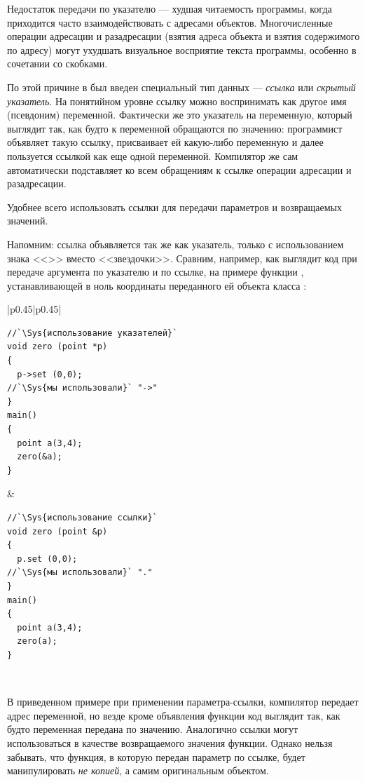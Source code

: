 Недостаток передачи по указателю --- худшая читаемость программы, когда приходится часто взаимодействовать с адресами
объектов. Многочисленные операции адресации и разадресации (взятия адреса объекта и взятия содержимого по адресу) могут
ухудшать визуальное восприятие текста программы, особенно в сочетании со скобками. 

По этой причине в  был введен специальный тип данных --- \emph{ссылка} или 
\emph{скрытый указатель}. На понятийном уровне ссылку можно воспринимать как другое имя
(псевдоним) переменной. Фактически же это указатель на переменную, который выглядит так, как будто к переменной
обращаются по значению: программист объявляет такую ссылку, присваивает ей какую-либо переменную и далее пользуется
ссылкой как еще одной переменной. Компилятор же сам автоматически подставляет ко всем обращениям к ссылке операции
адресации и разадресации.

Удобнее всего использовать ссылки для передачи параметров и возвращаемых значений.

Напомним: ссылка объявляется так же как указатель, только с использованием знака <<\Sys{\&}>> вместо <<звездочки>>.
Сравним, например, как выглядит код при передаче аргумента по указателю и по ссылке, на примере функции
, устанавливающей в ноль координаты переданного ей объекта класса
:
\begin{center}
\begin{tabular}{|p{}|p{}|}
\hline
\begin{lstlisting}
//`\Sys{использование указателей}`
void zero (point *p) 
{
  p->set (0,0);
//`\Sys{мы использовали}` "->"
}
main() 
{
  point a(3,4);
  zero(&a);
}
\end{lstlisting}
&
\begin{lstlisting}
//`\Sys{использование ссылки}`
void zero (point &p) 
{
  p.set (0,0);
//`\Sys{мы использовали}` "."
}
main() 
{
  point a(3,4);
  zero(a);
}
\end{lstlisting}
\\\hline
\end{tabular}
\end{center}

В приведенном примере при применении параметра-ссылки, компилятор передает 
адрес переменной, но везде кроме объявления функции код выглядит так, как 
будто переменная передана по значению. Аналогично ссылки могут использоваться 
в качестве возвращаемого значения функции. Однако нельзя забывать, что функция, 
в которую передан параметр по ссылке, будет манипулировать \emph{не копией}, а самим 
оригинальным объектом.

